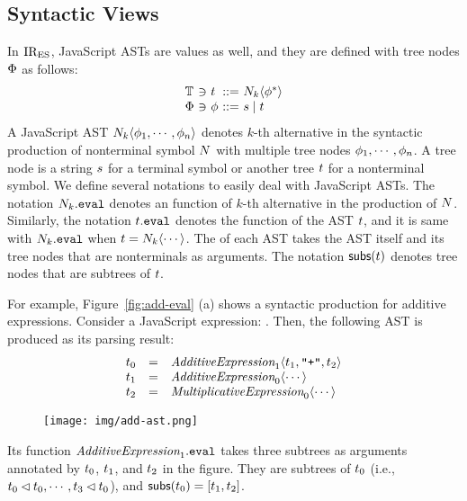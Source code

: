 \subsection{Syntactic Views}\label{sec:view}

In $\text{IR}_\text{ES}$, JavaScript ASTs are values as well, and they are defined with tree
nodes $\Phi$ as follows:
\[
  \begin{array}{l@{~}c@{~}l@{~}c@{~}l}
    \treeset &\ni& \tree &::=& \nt_k \langle \node^* \rangle\\
    \nodeset &\ni& \node &::=& \str \mid \tree\\
  \end{array}
\]
A JavaScript AST $N_k \langle \phi_1, \cdots, \phi_n \rangle$ denotes $k$-th
alternative in the syntactic production of nonterminal symbol $N$ with
multiple tree nodes $\phi_1, \cdots, \phi_n$.  A tree node is a string $s$
for a terminal symbol or another tree $t$ for a nonterminal symbol. We
define several notations to easily deal with JavaScript ASTs.  The notation
$\nt_k.\eval$ denotes an  function of $k$-th alternative in
the production of $N$.  Similarly, the notation $\tree.\eval$ denotes the
 function of the AST $t$, and it is same with
$\nt_k.\eval$ when $t = N_k \langle \cdots \rangle$. The
 of each AST takes the AST itself and its tree nodes that are
nonterminals as arguments.  The notation $\getsubs(\tree)$ denotes tree nodes
that are subtrees of $t$.

For example, Figure~\ref{fig:add-eval} (a) shows a syntactic production for
additive expressions.  Consider a JavaScript expression: .  Then,
the following AST is produced as its parsing result:
\[
  \begin{array}{lcl}
    \tree_0 &=&
    \essyn{AdditiveExpression}_1 \langle \tree_1, \code{"+"}, \tree_2 \rangle\\

    \tree_1 &=&
    \essyn{AdditiveExpression}_0 \langle \cdots \rangle\\

    \tree_2 &=&
    \essyn{MultiplicativeExpression}_0 \langle \cdots \rangle\\
  \end{array}
\]
\begin{figure}[H]
  \vspace*{-1em}
  \texttt{[image: img/add-ast.png]}
  \vspace*{-1em}
\end{figure}
\noindent Its  function $\essyn{AdditiveExpression}_1.\eval$
takes three subtrees as arguments annotated by $t_0$, $t_1$, and
$t_2$ in the figure. They are subtrees of $t_0$ (i.e., $t_0 \lhd
t_0, \cdots, t_3 \lhd t_0$), and $\getsubs(\tree_0) = [\tree_1,
\tree_2]$.

